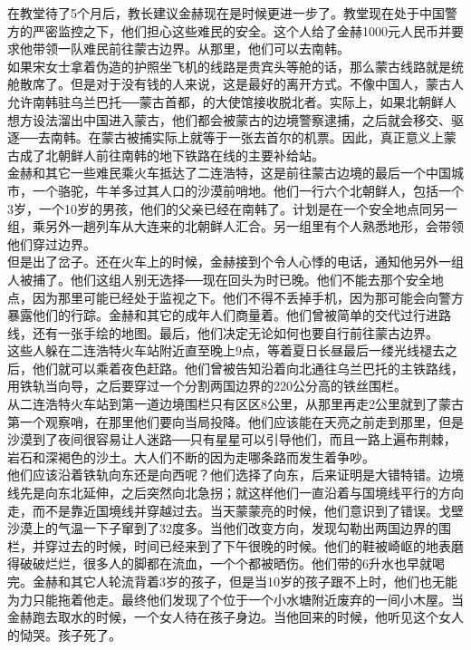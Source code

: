在教堂待了5个月后，教长建议金赫现在是时候更进一步了。教堂现在处于中国警方的严密监控之下，他们担心这些难民的安全。这个人给了金赫1000元人民币并要求他带领一队难民前往蒙古边界。从那里，他们可以去南韩。\\

如果宋女士拿着伪造的护照坐飞机的线路是贵宾头等舱的话，那么蒙古线路就是统舱散席了。但是对于没有钱的人来说，这是最好的离开方式。不像中国人，蒙古人允许南韩驻乌兰巴托──蒙古首都，的大使馆接收脱北者。实际上，如果北朝鲜人想方设法溜出中国进入蒙古，他们都会被蒙古的边境警察逮捕，之后就会移交、驱逐──去南韩。在蒙古被捕实际上就等于一张去首尔的机票。因此，真正意义上蒙古成了北朝鲜人前往南韩的地下铁路在线的主要补给站。\\

金赫和其它一些难民乘火车抵达了二连浩特，这是前往蒙古边境的最后一个中国城市，一个骆驼，牛羊多过其人口的沙漠前哨地。他们一行六个北朝鲜人，包括一个3岁，一个10岁的男孩，他们的父亲已经在南韩了。计划是在一个安全地点同另一组，乘另外一趟列车从大连来的北朝鲜人汇合。另一组里有个人熟悉地形，会带领他们穿过边界。\\

但是出了岔子。还在火车上的时候，金赫接到个令人心悸的电话，通知他另外一组人被捕了。他们这组人别无选择──现在回头为时已晚。他们不能去那个安全地点，因为那里可能已经处于监视之下。他们不得不丢掉手机，因为那可能会向警方暴露他们的行踪。金赫和其它的成年人们商量着。他们曾被简单的交代过行进路线，还有一张手绘的地图。最后，他们决定无论如何也要自行前往蒙古边界。\\

这些人躲在二连浩特火车站附近直至晚上9点，等着夏日长昼最后一缕光线褪去之后，他们就可以乘着夜色赶路。他们曾被告知沿着向北通往乌兰巴托的主铁路线，用铁轨当向导，之后要穿过一个分割两国边界的220公分高的铁丝围栏。\\

从二连浩特火车站到第一道边境围栏只有区区8公里，从那里再走2公里就到了蒙古第一个观察哨，在那里他们要向当局投降。他们应该能在天亮之前走到那里，但是沙漠到了夜间很容易让人迷路──只有星星可以引导他们，而且一路上遍布荆棘，岩石和深褐色的沙土。大人们不断的因为走哪条路而发生着争吵。\\

他们应该沿着铁轨向东还是向西呢？他们选择了向东，后来证明是大错特错。边境线先是向东北延伸，之后突然向北急拐；就这样他们一直沿着与国境线平行的方向走，而不是靠近国境线并穿越过去。当天蒙蒙亮的时候，他们意识到了错误。戈壁沙漠上的气温一下子窜到了32度多。当他们改变方向，发现勾勒出两国边界的围栏，并穿过去的时候，时间已经来到了下午很晚的时候。他们的鞋被崎岖的地表磨得破破烂烂，很多人的脚都在流血，一个个都被晒伤。他们带的6升水也早就喝完。金赫和其它人轮流背着3岁的孩子，但是当10岁的孩子跟不上时，他们也无能为力只能拖着他走。最终他们发现了个位于一个小水塘附近废弃的一间小木屋。当金赫跑去取水的时候，一个女人待在孩子身边。当他回来的时候，他听见这个女人的恸哭。孩子死了。\\

